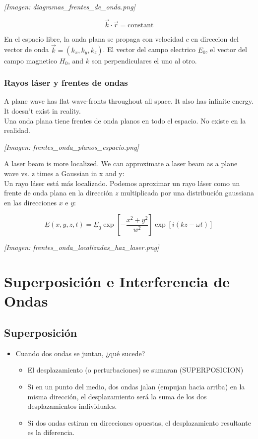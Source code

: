 \documentclass[12pt]{article}
\begin{document}
	\textit{[Imagen: diagramas\_frentes\_de\_onda.png]}
	
	\begin{equation*}
		\vec{k}\cdot\vec{r} = \text{constant}
	\end{equation*}
	
	En el espacio libre, la onda plana se propaga con velocidad $c$ en direccion del vector de onda $\vec{k} = (k_x, k_y, k_z)$. El vector del campo electrico $E_0$, el vector del campo magnetico $H_0$, and $k$ son perpendiculares el uno al otro.
	
	\subsubsection*{Rayos láser y frentes de ondas}
	A plane wave has flat wave-fronts throughout all space. It also has infinite energy. It doesn't exist in reality. \\
	Una onda plana tiene frentes de onda planos en todo el espacio. No existe en la realidad.
	
	\textit{[Imagen: frentes\_onda\_planos\_espacio.png]}
	
	\vspace{0.3cm}
	A laser beam is more localized. We can approximate a laser beam as a plane wave vs. z times a Gaussian in x and y: \\
	Un rayo láser está más localizado. Podemos aproximar un rayo láser como un frente de onda plana en la dirección $z$ multiplicada por una distribución gaussiana en las direcciones $x$ e $y$:
	
	\begin{equation*}
		\underline{E}(x,y,z,t) = \underline{E}_0 \exp\left[-\frac{x^2+y^2}{w^2}\right] \exp[i(kz - \omega t)]
	\end{equation*}
	
	\textit{[Imagen: frentes\_onda\_localizadas\_haz\_laser.png]}
	
	\section{Superposición e Interferencia de Ondas}
	
	\subsection{Superposición}
	\begin{itemize}
		\item Cuando dos ondas se juntan, ¿qué sucede?
		\begin{itemize}
			\item El desplazamiento (o perturbaciones) se sumaran (SUPERPOSICION)
			\item Si en un punto del medio, dos ondas jalan (empujan hacia arriba) en la misma dirección, el desplazamiento será la suma de los dos desplazamientos individuales.
			\item Si dos ondas estiran en direcciones opuestas, el desplazamiento resultante es la diferencia.
		\end{itemize}
	\end{itemize}
	
\end{document}
